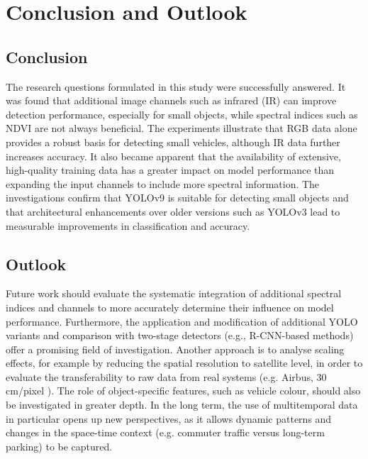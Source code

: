\chapter{Conclusion and Outlook}
\label{ch:conclusion}

\section{Conclusion}
The research questions formulated in this study were successfully answered.
It was found that additional image channels such as infrared (IR) can improve detection performance, especially for small objects, while spectral indices such as NDVI are not always beneficial. 
The experiments illustrate that RGB data alone provides a robust basis for detecting small vehicles, although IR data further increases accuracy.
It also became apparent that the availability of extensive, high-quality training data has a greater impact on model performance than expanding the input channels to include more spectral information. 
The investigations confirm that \acrshort{YOLO}v9 is suitable for detecting small objects and that architectural enhancements over older versions such as \acrshort{YOLO}v3 lead to measurable improvements in classification and accuracy.


\section{Outlook}
Future work should evaluate the systematic integration of additional spectral indices and channels to more accurately determine their influence on model performance.
Furthermore, the application and modification of additional \acrshort{YOLO} variants and comparison with two-stage detectors (e.g., \acrshort{R-CNN}-based methods) offer a promising field of investigation. 
Another approach is to analyse scaling effects, for example by reducing the spatial resolution to satellite level, in order to evaluate the transferability to raw data from real systems (e.g. Airbus, 30 cm/pixel \cite{airbus_neo}). 
The role of object-specific features, such as vehicle colour, should also be investigated in greater depth.
In the long term, the use of multitemporal data in particular opens up new perspectives, as it allows dynamic patterns and changes in the space-time context (e.g. commuter traffic versus long-term parking) to be captured.
